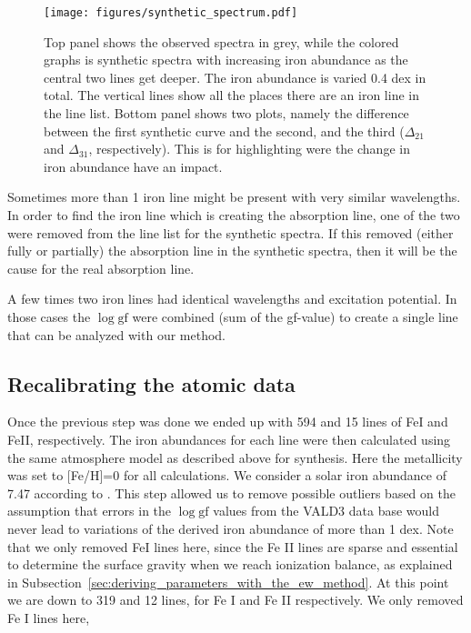 \documentclass{aa}
\begin{document}
\begin{figure}[tpb]
    \centering
    \texttt{[image: figures/synthetic\_spectrum.pdf]}
    \caption{Top panel shows the observed spectra in grey, while
        the colored graphs is synthetic spectra with increasing iron
        abundance as the central two lines get deeper. The iron abundance
        is varied 0.4 dex in total. The vertical lines show all the places
        there are an iron line in the line list. Bottom panel shows
        two plots, namely the difference between the first synthetic curve
        and the second, and the third ($\Delta_{21}$ and $\Delta_{31}$,
        respectively). This is for highlighting were the change in iron
        abundance have an impact.}
    \label{fig:synthesis}
\end{figure}


Sometimes more than 1 iron line might be present with very similar
wavelengths. In order to find the iron line which is creating the
absorption line, one of the two were removed from the line list for
the synthetic spectra. If this removed (either fully or partially) the
absorption line in the synthetic spectra, then it will be the cause for
the real absorption line.

A few times two iron lines had identical wavelengths and excitation
potential. In those cases the $\log \mathrm{gf}$ were combined (sum of
the gf-value) to create a single line that can be analyzed with our
method.


\subsection{Recalibrating the atomic data}
\label{ssub:Recalibrating-the-atomic-data}

Once the previous step was done we ended up with 594 and 15 lines
of FeI and FeII, respectively. The iron abundances for each line
were then calculated using the same atmosphere model as described
above for synthesis. Here the metallicity was set to [Fe/H]=0 for all
calculations. We consider a solar iron abundance of 7.47 according to
\cite{Gonzalez2000}. This step allowed us to remove possible outliers
based on the assumption that errors in the $\log \mathrm{gf}$ values
from the VALD3 data base would never lead to variations of the derived
iron abundance of more than 1 dex. Note that we only removed FeI lines
here, since the Fe II lines are sparse and essential to determine the
surface gravity when we reach ionization balance, as explained in
Subsection~\ref{sec:deriving_parameters_with_the_ew_method}. At this
point we are down to 319 and 12 lines, for Fe I and Fe II respectively.
We only removed Fe I lines here,
\end{document}
